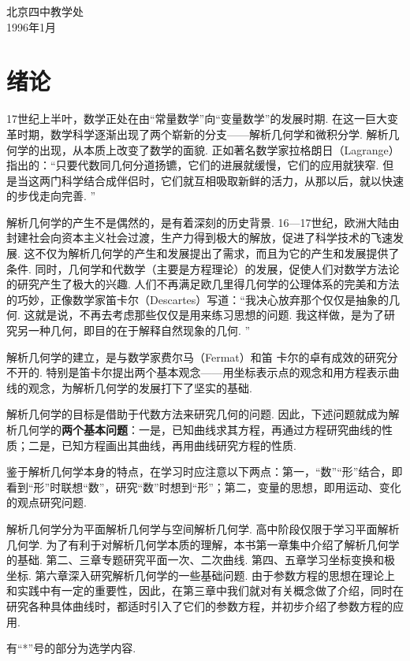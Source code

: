 \begin{flushright}
    北京四中教学处\\
    1996年1月
\end{flushright}

\chapter{绪论}
17世纪上半叶，数学正处在由“常量数学”向“变量数学”的发展时期. 在这一巨大变革时期，数学科学逐渐出现了两个崭新的分支——解析几何学和微积分学. 解析几何学的出现，从本质上改变了数学的面貌. 正如著名数学家拉格朗日（Lagrange）指出的：“只要代数同几何分道扬镳，它们的进展就缓慢，它们的应用就狭窄. 但是当这两门科学结合成伴侣时，它们就互相吸取新鲜的活力，从那以后，就以快速的步伐走向完善. ”

解析几何学的产生不是偶然的，是有着深刻的历史背景. 16—17世纪，欧洲大陆由封建社会向资本主义社会过渡，生产力得到极大的解放，促进了科学技术的飞速发展. 这不仅为解析几何学的产生和发展提出了需求，而且为它的产生和发展提供了条件. 同时，几何学和代数学（主要是方程理论）的发展，促使人们对数学方法论的研究产生了极大的兴趣. 人们不再满足欧几里得几何学的公理体系的完美和方法的巧妙，正像数学家笛卡尔（Descartes）写道：“我决心放弃那个仅仅是抽象的几何. 这就是说，不再去考虑那些仅仅是用来练习思想的问题. 我这样做，是为了研究另一种几何，即目的在于解释自然现象的几何. ”

解析几何学的建立，是与数学家费尔马（Fermat）和笛
卡尔的卓有成效的研究分不开的. 特别是笛卡尔提出两个基本观念——用坐标表示点的观念和用方程表示曲线的观念，为解析几何学的发展打下了坚实的基础. 

解析几何学的目标是借助于代数方法来研究几何的问题. 因此，下述问题就成为解析几何学的\textbf{两个基本问题}：一是，已知曲线求其方程，再通过方程研究曲线的性质；二是，已知方程画出其曲线，再用曲线研究方程的性质. 

鉴于解析几何学本身的特点，在学习时应注意以下两点：第一，“数”“形”结合，即看到“形”时联想“数”，研究“数”时想到“形”；第二，变量的思想，即用运动、变化的观点研究问题. 

解析几何学分为平面解析几何学与空间解析几何学. 高中阶段仅限于学习平面解析几何学. 为了有利于对解析几何学本质的理解，本书第一章集中介绍了解析几何学的基础. 第二、三章专题研究平面一次、二次曲线. 第四、五章学习坐标变换和极坐标. 第六章深入研究解析几何学的一些基础问题. 由于参数方程的思想在理论上和实践中有一定的重要性，因此，在第三章中我们就对有关概念做了介绍，同时在研究各种具体曲线时，都适时引入了它们的参数方程，并初步介绍了参数方程的应用. 

有“*”号的部分为选学内容. 






